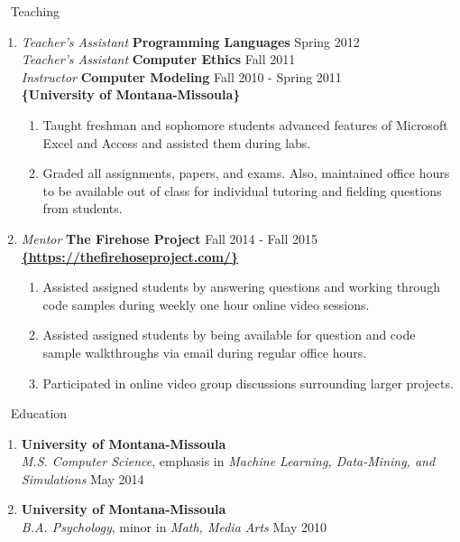 \documentclass[oneside]{article}%
\begin{document}
\
\noindent
\huge{Teaching}
\small
\begin{enumerate}[]
	\item \textit{Teacher's Assistant} \textbf{Programming Languages} \hfill Spring 2012\\
		\textit{Teacher's Assistant} \textbf{Computer Ethics} \hfill Fall 2011\\
		\textit{Instructor} \textbf{Computer Modeling} \hfill Fall 2010 - Spring 2011\\
		\textbf{\{University of Montana-Missoula\}}
		\begin{enumerate}[*]
			\item Taught freshman and sophomore students advanced features of Microsoft Excel and Access and assisted them during labs.
			\item Graded all assignments, papers, and exams. Also, maintained office hours to be available out of class for individual tutoring and fielding questions from students.
		\end{enumerate}
	\item \textit{Mentor} \textbf{The Firehose Project} \hfill Fall 2014 - Fall 2015\\
		\textbf{\href{https://thefirehoseproject.com/}{\{https://thefirehoseproject.com/\}}}
		\begin{enumerate}[*]
			\item Assisted assigned students by answering questions and working through code samples during weekly one hour online video sessions.
			\item Assisted assigned students by being available for question and code sample walkthroughs via email during regular office hours.
			\item Participated in online video group discussions surrounding larger projects.

		\end{enumerate}
\end{enumerate}
\
\noindent
\huge{Education}
\small
\begin{enumerate}[]
\item \textbf{University of Montana-Missoula}\\
	\textit{M.S. Computer Science}, emphasis in \textit{Machine Learning, Data-Mining, and Simulations} \hfill May 2014
\item \textbf{University of Montana-Missoula}\\
	\textit{B.A. Psychology}, minor in \textit{Math, Media Arts} \hfill May 2010
	\
\end{enumerate}
\end{document}
